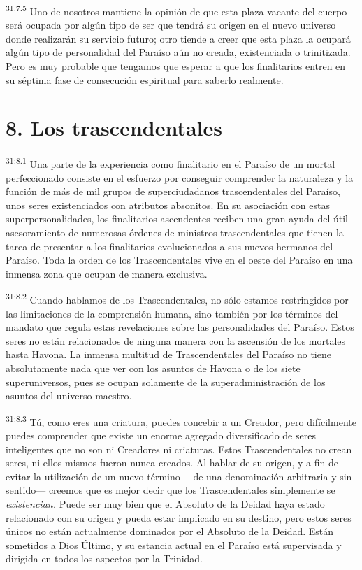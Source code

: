 \par
\textsuperscript{31:7.5} Uno de nosotros mantiene la opinión de que esta plaza vacante del cuerpo será ocupada por algún tipo de ser que tendrá su origen en el nuevo universo donde realizarán su servicio futuro; otro tiende a creer que esta plaza la ocupará algún tipo de personalidad del Paraíso aún no creada, existenciada o trinitizada. Pero es muy probable que tengamos que esperar a que los finalitarios entren en su séptima fase de consecución espiritual para saberlo realmente.

\section*{8. Los trascendentales}
\par
\textsuperscript{31:8.1} Una parte de la experiencia como finalitario en el Paraíso de un mortal perfeccionado consiste en el esfuerzo por conseguir comprender la naturaleza y la función de más de mil grupos de superciudadanos trascendentales del Paraíso, unos seres existenciados con atributos absonitos. En su asociación con estas superpersonalidades, los finalitarios ascendentes reciben una gran ayuda del útil asesoramiento de numerosas órdenes de ministros trascendentales que tienen la tarea de presentar a los finalitarios evolucionados a sus nuevos hermanos del Paraíso. Toda la orden de los Trascendentales vive en el oeste del Paraíso en una inmensa zona que ocupan de manera exclusiva.

\par
\textsuperscript{31:8.2} Cuando hablamos de los Trascendentales, no sólo estamos restringidos por las limitaciones de la comprensión humana, sino también por los términos del mandato que regula estas revelaciones sobre las personalidades del Paraíso. Estos seres no están relacionados de ninguna manera con la ascensión de los mortales hasta Havona. La inmensa multitud de Trascendentales del Paraíso no tiene absolutamente nada que ver con los asuntos de Havona o de los siete superuniversos, pues se ocupan solamente de la superadministración de los asuntos del universo maestro.

\par
\textsuperscript{31:8.3} Tú, como eres una criatura, puedes concebir a un Creador, pero difícilmente puedes comprender que existe un enorme agregado diversificado de seres inteligentes que no son ni Creadores ni criaturas. Estos Trascendentales no crean seres, ni ellos mismos fueron nunca creados. Al hablar de su origen, y a fin de evitar la utilización de un nuevo término ---de una denominación arbitraria y sin sentido--- creemos que es mejor decir que los Trascendentales simplemente se \textit{existencian.} Puede ser muy bien que el Absoluto de la Deidad haya estado relacionado con su origen y pueda estar implicado en su destino, pero estos seres únicos no están actualmente dominados por el Absoluto de la Deidad. Están sometidos a Dios Último, y su estancia actual en el Paraíso está supervisada y dirigida en todos los aspectos por la Trinidad.

